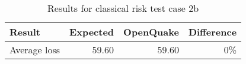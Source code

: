 \begin{table}[htbp]

\centering
\begin{tabular}{ l r r r }

\hline
\rowcolor{anti-flashwhite}
\bf{Result} & \bf{Expected} & \bf{OpenQuake} & \bf{Difference}\\
\hline
Average loss & 59.60 & 59.60 & 0\% \\
\hline
\end{tabular}

\caption{Results for classical risk test case 2b}
\label{tab:result-cr-2b}
\end{table}